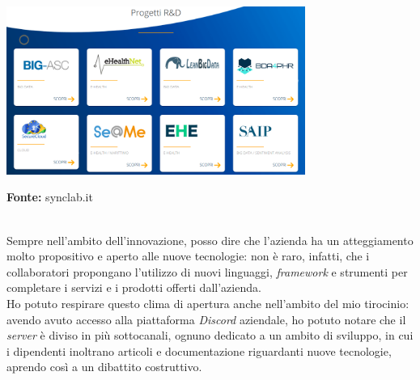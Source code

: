 \begin{minipage}{\linewidth}
  \centering
    \includegraphics[height=5.5cm]{immagini/progetti}
  \caption*{\textbf{Fonte:} synclab.it}
\end{minipage} \\

Sempre nell'ambito dell'innovazione, posso dire che l'azienda ha un atteggiamento molto propositivo e aperto alle nuove tecnologie: non è raro, infatti, che i collaboratori propongano l'utilizzo di nuovi linguaggi, \textit{framework} e strumenti per completare i servizi e i prodotti offerti dall'azienda. \\
Ho potuto respirare questo clima di apertura anche nell'ambito del mio tirocinio: avendo avuto accesso alla piattaforma \textit{Discord} aziendale, ho potuto notare che il \textit{server} è diviso in più sottocanali, ognuno dedicato a un ambito di sviluppo, in cui i dipendenti inoltrano articoli e documentazione riguardanti nuove tecnologie, aprendo così a un dibattito costruttivo.
